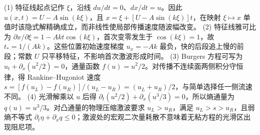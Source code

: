 (1) 特征线起点记作 \(\xi\)，沿线 \(du/dt=0\)、\(dx/dt=u\)。因此 \(u(x,t)=U-A\sin(k\xi)\)，且 \(x=\xi+[U-A\sin(k\xi)]t\)，在映射 \(\xi\mapsto x\) 单值时该隐式解精确成立，而非线性使局部传播速度随波幅改变。
(2) 特征线雅可比为 \(\partial x/\partial\xi=1-Akt\cos(k\xi)\)，首次变零发生于 \(\cos(k\xi)=1\)，故 \(t_*=1/(Ak)\)。这些位置初始速度梯度 \(u_x=-Ak\) 最负，快的后段追上慢的前段；常数 \(U\) 只平移特征，不影响首次激波形成时间。
(3) Burgers 方程可写为 \(u_t+\partial_x(u^2/2)=0\)，通量函数 \(f(u)=u^2/2\)。对传播不连续面两侧积分守恒律，得 Rankine–Hugoniot 速度 \(s=[f(u_L)-f(u_R)]/(u_L-u_R)=(u_L+u_R)/2\)，与简单选择任一侧流速不同。
(4) 光滑解乘以 \(u\) 后得 \(\partial_t(u^2/2)+\partial_x(u^3/3)=0\)，所以熵通量为 \(q(u)=u^3/3\)。对凸通量的物理压缩激波要求 \(u_L>u_R\)，满足 \(u_L>s>u_R\)，且弱熵不等式 \(\partial_t\eta+\partial_xq\le0\)；激波处的宏观二次量耗散不意味着无粘方程的光滑区出现阻尼项。

